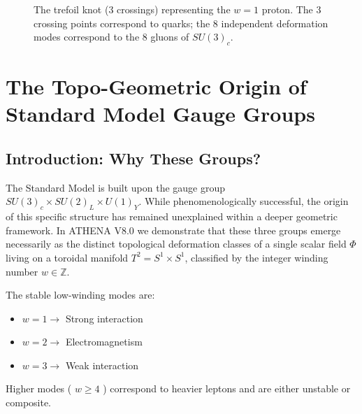 \documentclass[11pt,a4paper]{article}
\begin{document}
\begin{figure}[H]
\centering
{}
\caption{The trefoil knot (3 crossings) representing the \(w=1\) proton. The 3 crossing points correspond to quarks; the 8 independent deformation modes correspond to the 8 gluons of \(SU(3)_c\).}
\end{figure}

\section{The Topo-Geometric Origin of Standard Model Gauge Groups}

\subsection{Introduction: Why These Groups?}
The Standard Model is built upon the gauge group \(SU(3)_c \times SU(2)_L \times U(1)_Y\). While phenomenologically successful, the origin of this specific structure has remained unexplained within a deeper geometric framework. In ATHENA V8.0 we demonstrate that these three groups emerge necessarily as the distinct topological deformation classes of a single scalar field \(\Phi\) living on a toroidal manifold \(T^2 = S^1 \times S^1\), classified by the integer winding number \(w \in \mathbb{Z}\).

The stable low-winding modes are:
\begin{itemize}
\item \(w = 1 \rightarrow\) Strong interaction
\item \(w = 2 \rightarrow\) Electromagnetism
\item \(w = 3 \rightarrow\) Weak interaction
\end{itemize}
Higher modes ( \(w \geq 4\) ) correspond to heavier leptons and are either unstable or composite.
\end{document}

